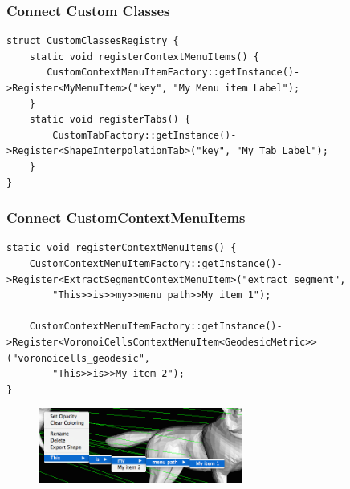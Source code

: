 \documentclass[compress]{beamer}
\begin{document}
\begin{frame}[fragile]
\frametitle{Connect Custom Classes}

\begin{lstlisting}
struct CustomClassesRegistry {
    static void registerContextMenuItems() {
       CustomContextMenuItemFactory::getInstance()->Register<MyMenuItem>("key", "My Menu item Label");
    }
    static void registerTabs() {
        CustomTabFactory::getInstance()->Register<ShapeInterpolationTab>("key", "My Tab Label");
    }
}
\end{lstlisting}
  
\end{frame}


\begin{frame}[fragile]
\frametitle{Connect CustomContextMenuItems}
\begin{lstlisting}
static void registerContextMenuItems() {
    CustomContextMenuItemFactory::getInstance()->Register<ExtractSegmentContextMenuItem>("extract_segment",
        "This>>is>>my>>menu path>>My item 1");
   
    CustomContextMenuItemFactory::getInstance()->Register<VoronoiCellsContextMenuItem<GeodesicMetric>>("voronoicells_geodesic",
        "This>>is>>My item 2");
}     
\end{lstlisting}
  \begin{figure}[h]
	\centering
	\includegraphics[width=0.60\textwidth]{menu.png}
\end{figure}
\end{frame}
\end{document}
